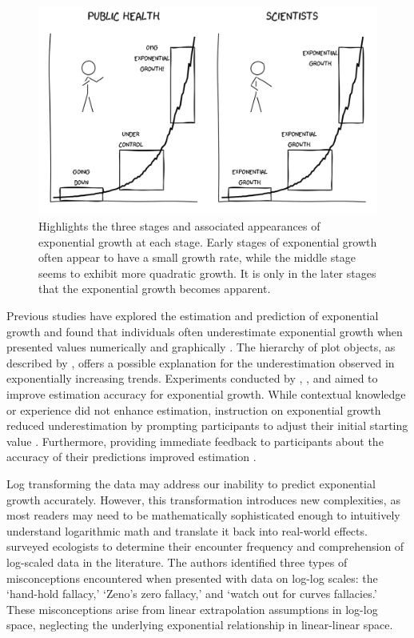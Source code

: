 \documentclass[12pt]{article}
\begin{document}
\begin{figure}[tbp]

{\centering \includegraphics[width=1\linewidth,]{images/exponential-stages-comic} 

}

\caption{Highlights the three stages and associated appearances of exponential growth at each stage. Early stages of exponential growth often appear to have a small growth rate, while the middle stage seems to exhibit more quadratic growth. It is only in the later stages that the exponential growth becomes apparent.}\label{fig:exponential-stages}
\end{figure}

Previous studies have explored the estimation and prediction of
exponential growth and found that individuals often underestimate
exponential growth when presented values numerically and graphically
\citep{wagenaar_misperception_1975}. The hierarchy of plot objects, as
described by \citet{cleveland_graphical_1985}, offers a possible
explanation for the underestimation observed in exponentially increasing
trends. Experiments conducted by \citet{wagenaar_misperception_1975},
\citet{jones_polynomial_1977}, and \citet{mackinnon_feedback_1991} aimed
to improve estimation accuracy for exponential growth. While contextual
knowledge or experience did not enhance estimation, instruction on
exponential growth reduced underestimation by prompting participants to
adjust their initial starting value
\citep{wagenaar_misperception_1975, jones_polynomial_1977}. Furthermore,
providing immediate feedback to participants about the accuracy of their
predictions improved estimation \citep{mackinnon_feedback_1991}.

Log transforming the data may address our inability to predict
exponential growth accurately. However, this transformation introduces
new complexities, as most readers may need to be mathematically
sophisticated enough to intuitively understand logarithmic math and
translate it back into real-world effects.
\citet{menge_logarithmic_2018} surveyed ecologists to determine their
encounter frequency and comprehension of log-scaled data in the
literature. The authors identified three types of misconceptions
encountered when presented with data on log-log scales: the `hand-hold
fallacy,' `Zeno's zero fallacy,' and `watch out for curves fallacies.'
These misconceptions arise from linear extrapolation assumptions in
log-log space, neglecting the underlying exponential relationship in
linear-linear space.
\end{document}
